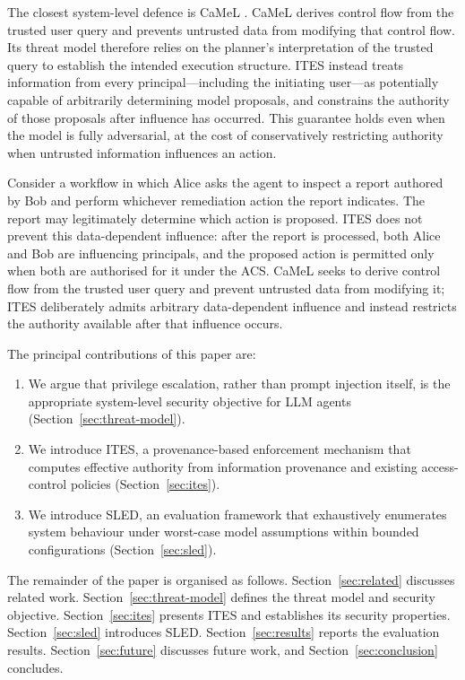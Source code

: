 \documentclass{article}
\begin{document}
The closest system-level defence is CaMeL
\citep{debenedetti2025defeatingpromptinjectionsdesign}. CaMeL derives control
flow from the trusted user query and prevents untrusted data from modifying
that control flow. Its threat model therefore relies on the planner's
interpretation of the trusted query to establish the intended execution
structure. ITES instead treats information from every principal---including the
initiating user---as potentially capable of arbitrarily determining model
proposals, and constrains the authority of those proposals after influence has
occurred. This guarantee holds even when the model is fully adversarial, at the
cost of conservatively restricting authority when untrusted information
influences an action.

Consider a workflow in which Alice asks the agent to inspect a report authored
by Bob and perform whichever remediation action the report indicates. The
report may legitimately determine which action is proposed. ITES does not
prevent this data-dependent influence: after the report is processed, both
Alice and Bob are influencing principals, and the proposed action is permitted
only when both are authorised for it under the ACS. CaMeL seeks to derive
control flow from the trusted user query and prevent untrusted data from
modifying it; ITES deliberately admits arbitrary data-dependent influence and
instead restricts the authority available after that influence occurs.

The principal contributions of this paper are:

\begin{enumerate}[leftmargin=*,nosep]
  \item We argue that privilege escalation, rather than prompt injection
    itself, is the appropriate system-level security objective for LLM agents
    (Section~\ref{sec:threat-model}).

  \item We introduce ITES, a provenance-based enforcement mechanism that
    computes effective authority from information provenance and existing
    access-control policies (Section~\ref{sec:ites}).

  \item We introduce SLED, an evaluation framework that exhaustively enumerates
    system behaviour under worst-case model assumptions within bounded
    configurations (Section~\ref{sec:sled}).
\end{enumerate}

The remainder of the paper is organised as follows.
Section~\ref{sec:related} discusses related work.
Section~\ref{sec:threat-model} defines the threat model and security objective.
Section~\ref{sec:ites} presents ITES and establishes its security properties.
Section~\ref{sec:sled} introduces SLED. Section~\ref{sec:results} reports the
evaluation results. Section~\ref{sec:future} discusses future work, and
Section~\ref{sec:conclusion} concludes.
\end{document}
